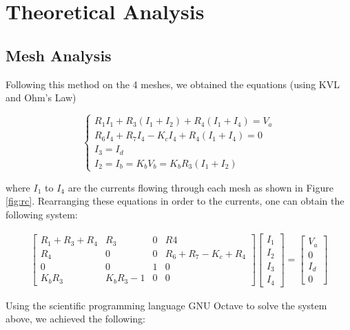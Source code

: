 \section{Theoretical Analysis}
\label{sec:analysis}

\subsection{Mesh Analysis}

Following this method on the 4 meshes, we obtained the equations (using KVL and Ohm's Law)

\begin{equation}
\begin{cases}
R_1 I_1 + R_3 (I_1+I_2)+R_4(I_1+I_4)=V_a\\
R_6 I_4 + R_7 I_4 -K_c I_4 + R_4 (I_1+I_4)=0\\
I_3=I_d\\
I_2=I_b=K_b V_b = K_b R_3 (I_1+I_2)
\end{cases}
\end{equation}

where $I_1$ to $I_4$ are the currents flowing through each mesh as shown in Figure \ref{fig:rc}. Rearranging these equations in order to the currents, one can obtain the following system:

\begin{gather}
    \begin{bmatrix}
     R_1+R_3+R_4 & R_3 & 0 & R4 \\
     R_4 & 0 & 0 & R_6+R_7-K_c+R_4\\
     0 & 0 & 1 & 0 \\
     K_b R_3 & K_b R_3 -1 & 0 & 0 
    \end{bmatrix}
    \begin{bmatrix}
     I_1\\
     I_2\\
     I_3\\
     I_4
    \end{bmatrix}
    =
    \begin{bmatrix}
     V_a\\
     0\\
     I_d\\
     0
    \end{bmatrix}
\end{gather}

Using the scientific programming language GNU Octave to solve the system above, we achieved the following:

%     

